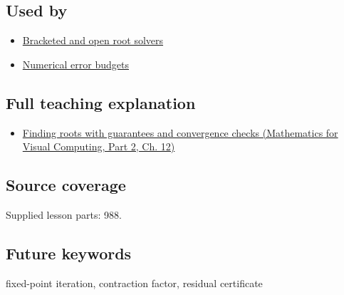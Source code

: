 \subsection{Used by}\label{appendix-d83b0ad1be7f-used-by}

\hypertarget{appendix-d83b0ad1be7f-used-by}{}

\begin{itemize}
\tightlist
\item
  \hyperref[appendix-f63eb850796d]{Bracketed and open root solvers}
\item
  \hyperref[appendix-31b8c295e05f]{Numerical error budgets}
\end{itemize}

\subsection{Full teaching explanation}\label{appendix-d83b0ad1be7f-full-teaching-explanation}

\hypertarget{appendix-d83b0ad1be7f-full-teaching-explanation}{}

\begin{itemize}
\tightlist
\item
  \href{../02-Mathematics-for-Visual-Computing-P02/main.pdf\#nameddest=02-foundations-ii-ch028-finding-roots-with-guarantees-and-convergence-checks}{Finding roots with guarantees and convergence checks (Mathematics for Visual Computing, Part 2, Ch. 12)}
\end{itemize}

\subsection{Source coverage}\label{appendix-d83b0ad1be7f-source-coverage}

\hypertarget{appendix-d83b0ad1be7f-source-coverage}{}

Supplied lesson parts: 988.

\subsection{Future keywords}\label{appendix-d83b0ad1be7f-future-keywords}

\hypertarget{appendix-d83b0ad1be7f-future-keywords}{}

fixed-point iteration, contraction factor, residual certificate
